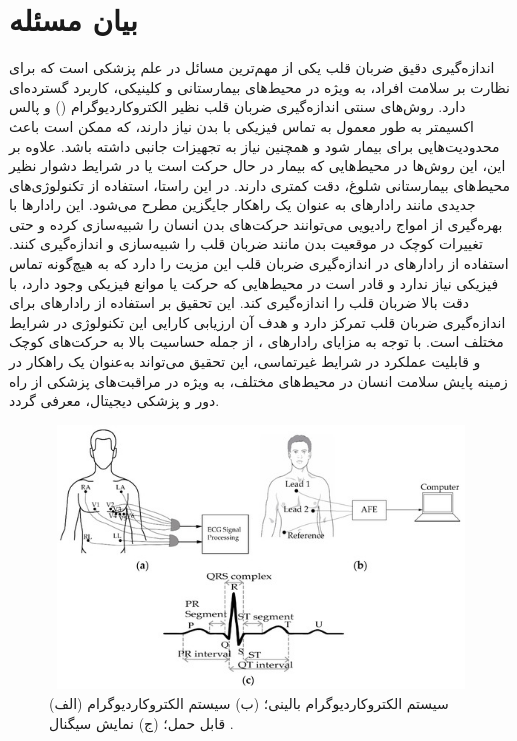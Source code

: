 
\section{بیان مسئله }\label{sec1}


اندازه‌گیری دقیق ضربان قلب یکی از مهم‌ترین مسائل در علم پزشکی است که برای نظارت بر سلامت افراد، به ویژه در محیط‌های بیمارستانی و کلینیکی، کاربرد گسترده‌ای دارد. روش‌های سنتی اندازه‌گیری ضربان قلب نظیر الکتروکاردیوگرام () و پالس اکسیمتر به طور معمول به تماس فیزیکی با بدن نیاز دارند، که ممکن است باعث محدودیت‌هایی برای بیمار شود و همچنین نیاز به تجهیزات جانبی داشته باشد. علاوه بر این، این روش‌ها در محیط‌هایی که بیمار در حال حرکت است یا در شرایط دشوار نظیر محیط‌های بیمارستانی شلوغ، دقت کمتری دارند.
در این راستا، استفاده از تکنولوژی‌های جدیدی مانند رادارهای  به عنوان یک راهکار جایگزین مطرح می‌شود. این رادارها با بهره‌گیری از امواج رادیویی می‌توانند حرکت‌های بدن انسان را شبیه‌سازی کرده و حتی تغییرات کوچک در موقعیت بدن مانند ضربان قلب را شبیه‌سازی و اندازه‌گیری کنند. استفاده از رادارهای  در اندازه‌گیری ضربان قلب این مزیت را دارد که به هیچ‌گونه تماس فیزیکی نیاز ندارد و قادر است در محیط‌هایی که حرکت یا موانع فیزیکی وجود دارد، با دقت بالا ضربان قلب را اندازه‌گیری کند.
این تحقیق بر استفاده از رادارهای  برای اندازه‌گیری ضربان قلب تمرکز دارد و هدف آن ارزیابی کارایی این تکنولوژی در شرایط مختلف است. با توجه به مزایای رادارهای ، از جمله حساسیت بالا به حرکت‌های کوچک و قابلیت عملکرد در شرایط غیرتماسی، این تحقیق می‌تواند به‌عنوان یک راهکار در زمینه پایش سلامت انسان در محیط‌های مختلف، به ویژه در مراقبت‌های پزشکی از راه دور و پزشکی دیجیتال، معرفی گردد.

\vspace{2cm}
\begin{center}
\begin{figure}[!h]
\includegraphics[height=7cm,width=12cm]{Images/chapter1/1-1.jpg}
\caption{(الف) سیستم الکتروکاردیوگرام بالینی؛ (ب) سیستم الکتروکاردیوگرام قابل حمل؛ (ج) نمایش سیگنال .\cite{kebe2020human}
}
\end{figure}
\end{center}
\vspace{2cm}

